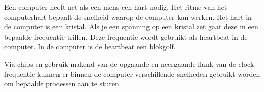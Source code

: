 Een computer heeft net als een mens een hart nodig. Het ritme van het computerhart bepaalt de snelheid waarop de computer kan werken. Het hart in de computer is een kristal. Als je een spanning op een kristal zet gaat deze in een bepaalde frequentie trillen. Deze frequentie wordt gebruikt als heartbeat in de computer. In de computer is de heartbeat een blokgolf.

Via chips en gebruik makend van de opgaande en neergaande flank van de clock frequentie kunnen er binnen de computer verschillende snelheden gebruikt worden om bepaalde processen aan te sturen.

